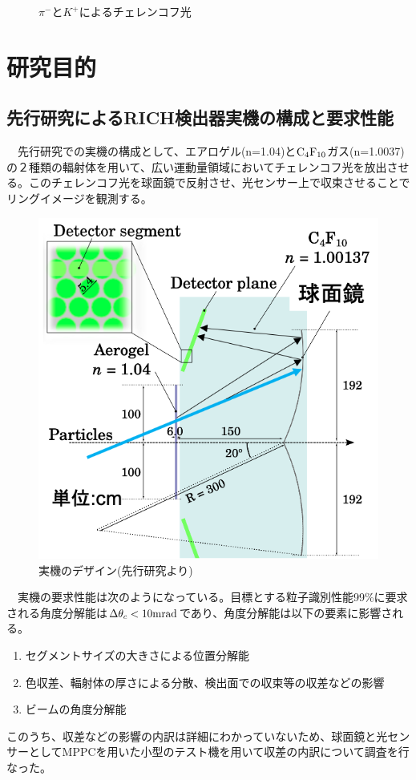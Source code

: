 \documentclass[uplatex, titlepage, dvipdfmx, 12pt, a4paper]{jsreport}
\begin{document}
\begin{figure}[htbp]
\begin{center}
\begin{tabular}{c}
    \end{tabular}
    \caption{$\pi^-とK^+によるチェレンコフ光$}
    \label{fig:piKcherenkov}
  \end{center}
\end{figure}

\section{研究目的}
\subsection{先行研究によるRICH検出器実機の構成と要求性能}
　先行研究での実機の構成として、エアロゲル(n=1.04)と$\rm{C_4F_{10}}$ガス(n=1.0037)の２種類の輻射体を用いて、広い運動量領域においてチェレンコフ光を放出させる。このチェレンコフ光を球面鏡で反射させ、光センサー上で収束させることでリングイメージを観測する。

\begin{figure}[htbp]
  \begin{center} 
    \includegraphics[clip, scale=0.8]{image/RICH.png}
    \caption{実機のデザイン(先行研究より)} 
    \label{fig:RICH} 
  \end{center}
\end{figure}
　実機の要求性能は次のようになっている。目標とする粒子識別性能99\%に要求される角度分解能は$\Delta\theta_c < 10 \rm{mrad}$であり、角度分解能は以下の要素に影響される。
\begin{enumerate}
  \item セグメントサイズの大きさによる位置分解能
  \item 色収差、輻射体の厚さによる分散、検出面での収束等の収差などの影響
  \item ビームの角度分解能
\end{enumerate}
このうち、収差などの影響の内訳は詳細にわかっていないため、球面鏡と光センサーとしてMPPCを用いた小型のテスト機を用いて収差の内訳について調査を行なった。
\end{document}
